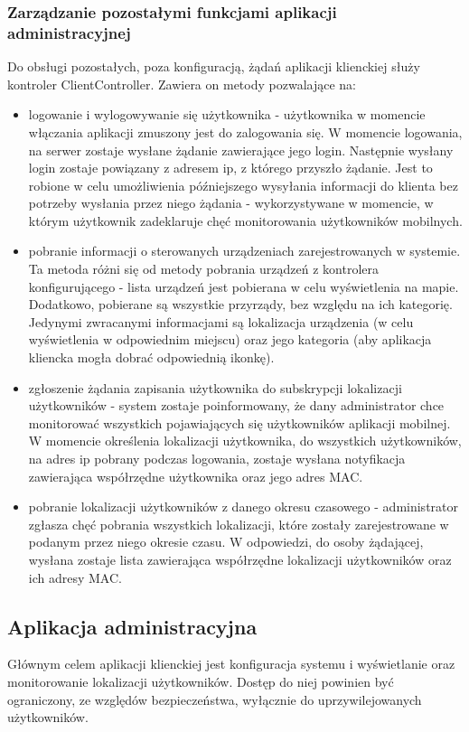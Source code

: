 \documentclass{article}
\begin{document}
	\subsubsection{Zarządzanie pozostałymi funkcjami aplikacji administracyjnej}
		Do obsługi pozostałych, poza konfiguracją, żądań aplikacji klienckiej służy kontroler ClientController. Zawiera on metody pozwalające na:
		\begin{itemize}
			\item logowanie i wylogowywanie się użytkownika - użytkownika w momencie włączania aplikacji zmuszony jest do zalogowania się. W momencie logowania, na serwer zostaje wysłane żądanie zawierające jego login. Następnie wysłany login zostaje powiązany z adresem ip, z którego przyszło żądanie. Jest to robione w celu umożliwienia późniejszego wysyłania informacji do klienta bez potrzeby wysłania przez niego żądania - wykorzystywane w momencie, w którym użytkownik zadeklaruje chęć monitorowania użytkowników mobilnych.
			\item pobranie informacji o sterowanych urządzeniach zarejestrowanych w systemie. Ta metoda różni się od metody pobrania urządzeń z kontrolera konfigurującego - lista urządzeń jest pobierana w celu wyświetlenia na mapie. Dodatkowo, pobierane są wszystkie przyrządy, bez względu na ich kategorię. Jedynymi zwracanymi informacjami są lokalizacja urządzenia (w celu wyświetlenia w odpowiednim miejscu) oraz jego kategoria (aby aplikacja kliencka mogła dobrać odpowiednią ikonkę).
			\item zgłoszenie żądania zapisania użytkownika do subskrypcji lokalizacji użytkowników - system zostaje poinformowany, że dany administrator chce monitorować wszystkich pojawiających się użytkowników aplikacji mobilnej. W momencie określenia lokalizacji użytkownika, do wszystkich użytkowników, na adres ip pobrany podczas logowania, zostaje wysłana notyfikacja zawierająca współrzędne użytkownika oraz jego adres MAC.
			\item pobranie lokalizacji użytkowników z danego okresu czasowego - administrator zgłasza chęć pobrania wszystkich lokalizacji, które zostały zarejestrowane w podanym przez niego okresie czasu. W odpowiedzi, do osoby żądającej, wysłana zostaje lista zawierająca współrzędne lokalizacji użytkowników oraz ich adresy MAC.
		\end{itemize}	
	\subsection{Aplikacja administracyjna}
		Głównym celem aplikacji klienckiej jest konfiguracja systemu i wyświetlanie oraz monitorowanie lokalizacji użytkowników. Dostęp do niej powinien być ograniczony, ze względów bezpieczeństwa, wyłącznie do uprzywilejowanych użytkowników.
\end{document}
